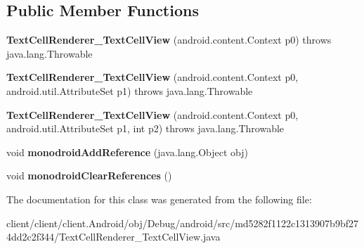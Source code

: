 \subsection*{Public Member Functions}
\begin{DoxyCompactItemize}
\item 
\hypertarget{classmd5282f1122c1313907b9bf274dd2c2f344_1_1TextCellRenderer__TextCellView_acd73509b9ddd39061c9cf871cd2f4752}{}{\bfseries Text\+Cell\+Renderer\+\_\+\+Text\+Cell\+View} (android.\+content.\+Context p0)  throws java.\+lang.\+Throwable 	\label{classmd5282f1122c1313907b9bf274dd2c2f344_1_1TextCellRenderer__TextCellView_acd73509b9ddd39061c9cf871cd2f4752}

\item 
\hypertarget{classmd5282f1122c1313907b9bf274dd2c2f344_1_1TextCellRenderer__TextCellView_aedca3ceb8bfda87cb7f14c46ebe20a97}{}{\bfseries Text\+Cell\+Renderer\+\_\+\+Text\+Cell\+View} (android.\+content.\+Context p0, android.\+util.\+Attribute\+Set p1)  throws java.\+lang.\+Throwable 	\label{classmd5282f1122c1313907b9bf274dd2c2f344_1_1TextCellRenderer__TextCellView_aedca3ceb8bfda87cb7f14c46ebe20a97}

\item 
\hypertarget{classmd5282f1122c1313907b9bf274dd2c2f344_1_1TextCellRenderer__TextCellView_a0e765041b25e0e8f5eb98ff6fc387bef}{}{\bfseries Text\+Cell\+Renderer\+\_\+\+Text\+Cell\+View} (android.\+content.\+Context p0, android.\+util.\+Attribute\+Set p1, int p2)  throws java.\+lang.\+Throwable 	\label{classmd5282f1122c1313907b9bf274dd2c2f344_1_1TextCellRenderer__TextCellView_a0e765041b25e0e8f5eb98ff6fc387bef}

\item 
\hypertarget{classmd5282f1122c1313907b9bf274dd2c2f344_1_1TextCellRenderer__TextCellView_a7f4d4a562148ce30580d60ecfda75b00}{}void {\bfseries monodroid\+Add\+Reference} (java.\+lang.\+Object obj)\label{classmd5282f1122c1313907b9bf274dd2c2f344_1_1TextCellRenderer__TextCellView_a7f4d4a562148ce30580d60ecfda75b00}

\item 
\hypertarget{classmd5282f1122c1313907b9bf274dd2c2f344_1_1TextCellRenderer__TextCellView_a8be6e2c4ba0b8ccc38d95f7cc611c847}{}void {\bfseries monodroid\+Clear\+References} ()\label{classmd5282f1122c1313907b9bf274dd2c2f344_1_1TextCellRenderer__TextCellView_a8be6e2c4ba0b8ccc38d95f7cc611c847}

\end{DoxyCompactItemize}


The documentation for this class was generated from the following file\+:\begin{DoxyCompactItemize}
\item 
client/client/client.\+Android/obj/\+Debug/android/src/md5282f1122c1313907b9bf274dd2c2f344/Text\+Cell\+Renderer\+\_\+\+Text\+Cell\+View.\+java\end{DoxyCompactItemize}

